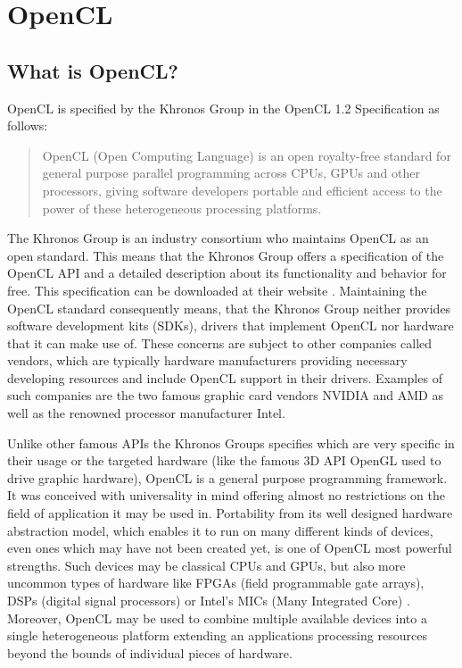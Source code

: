 \section{OpenCL}

\subsection{What is OpenCL?}
OpenCL is specified by the Khronos Group in the OpenCL 1.2 Specification as follows:

\begin{quote}
OpenCL (Open Computing Language) is an open royalty-free standard for general purpose
parallel programming across CPUs, GPUs and other processors, giving software developers
portable and efficient access to the power of these heterogeneous processing platforms. \cite{opencl_spec}
\end{quote}

The Khronos Group is an industry consortium who maintains OpenCL as an open standard. This means that the Khronos Group offers a specification of the OpenCL API and a detailed description about its functionality and behavior for free. This specification can be downloaded at their website \cite{opencl_spec}. Maintaining the OpenCL standard consequently means, that the Khronos Group neither provides software development kits (SDKs), drivers that implement OpenCL nor hardware that it can make use of. These concerns are subject to other companies called vendors, which are typically hardware manufacturers providing necessary developing resources and include OpenCL support in their drivers. Examples of such companies are the two famous graphic card vendors NVIDIA and AMD as well as the renowned processor manufacturer Intel.

Unlike other famous APIs the Khronos Groups specifies which are very specific in their usage or the targeted hardware (like the famous 3D API OpenGL used to drive graphic hardware), OpenCL is a general purpose programming framework. It was conceived with universality in mind offering almost no restrictions on the field of application it may be used in. Portability from its well designed hardware abstraction model, which enables it to run on many different kinds of devices, even ones which may have not been created yet, is one of OpenCL most powerful strengths. Such devices may be classical CPUs and GPUs, but also more uncommon types of hardware like FPGAs (field programmable gate arrays), DSPs (digital signal processors) or Intel's MICs (Many Integrated Core) \cite{mic}. Moreover, OpenCL may be used to combine multiple available devices into a single heterogeneous platform extending an applications processing resources beyond the bounds of individual pieces of hardware.

